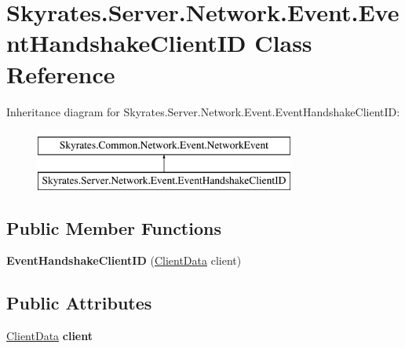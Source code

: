 \hypertarget{class_skyrates_1_1_server_1_1_network_1_1_event_1_1_event_handshake_client_i_d}{\section{Skyrates.\-Server.\-Network.\-Event.\-Event\-Handshake\-Client\-I\-D Class Reference}
\label{class_skyrates_1_1_server_1_1_network_1_1_event_1_1_event_handshake_client_i_d}
}
Inheritance diagram for Skyrates.\-Server.\-Network.\-Event.\-Event\-Handshake\-Client\-I\-D\-:\begin{figure}[H]
\begin{center}
\leavevmode
\includegraphics[height=2.000000cm]{class_skyrates_1_1_server_1_1_network_1_1_event_1_1_event_handshake_client_i_d}
\end{center}
\end{figure}
\subsection*{Public Member Functions}
\begin{DoxyCompactItemize}
\item 
\hypertarget{class_skyrates_1_1_server_1_1_network_1_1_event_1_1_event_handshake_client_i_d_a240b3343d9df5aa488bb8fcb63e18c2a}{{\bfseries Event\-Handshake\-Client\-I\-D} (\hyperlink{class_skyrates_1_1_server_1_1_network_1_1_client_data}{Client\-Data} client)}\label{class_skyrates_1_1_server_1_1_network_1_1_event_1_1_event_handshake_client_i_d_a240b3343d9df5aa488bb8fcb63e18c2a}

\end{DoxyCompactItemize}
\subsection*{Public Attributes}
\begin{DoxyCompactItemize}
\item 
\hypertarget{class_skyrates_1_1_server_1_1_network_1_1_event_1_1_event_handshake_client_i_d_a8e2e21af24e54054e783cca22fbb55ca}{\hyperlink{class_skyrates_1_1_server_1_1_network_1_1_client_data}{Client\-Data} {\bfseries client}}\label{class_skyrates_1_1_server_1_1_network_1_1_event_1_1_event_handshake_client_i_d_a8e2e21af24e54054e783cca22fbb55ca}

\end{DoxyCompactItemize}
